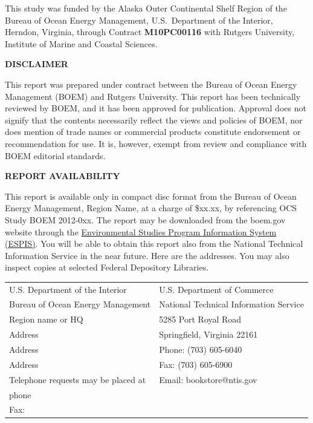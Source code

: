 This study was funded by the Alaska Outer Continental Shelf Region
of the Bureau of Ocean Energy Management, U.S.\ Department of the
Interior, Herndon, Virginia, through Contract
{\bf M10PC00116} with Rutgers University, Institute of Marine
and Coastal Sciences.


\newpage
\vfil
\centerline{\bf DISCLAIMER}

\vfil
\noindent
This report was prepared under contract between the Bureau of Ocean
Energy Management (BOEM) and Rutgers University. This report has
been technically reviewed by BOEM, and it has been approved for
publication. Approval does not signify that the contents necessarily
reflect the views and policies of BOEM, nor does mention of trade
names or commercial products constitute endorsement or
recommendation for use. It is, however, exempt from review and
compliance with BOEM editorial standards.

\vfil
\centerline{\bf REPORT AVAILABILITY}
\vfil

\noindent
This report is available only in compact disc format from the Bureau
of Ocean Energy Management, Region Name, at a charge of \$xx.xx, by
referencing OCS Study BOEM 2012-0xx. The report may be downloaded
from the boem.gov website through the
\href{http://www.data.boem.gov/homepg/data_center/other/espis/espismaster.asp?appid=1}
{Environmental Studies Program Information System (ESPIS)}. You will
be able to obtain this report also from the National Technical
Information Service in the near future. Here are the addresses. You
may also inspect copies at selected Federal Depository Libraries.

\begin{center}
\begin{tabular}{ll}
  U.S. Department of the Interior & U.S. Department of Commerce \\
  Bureau of Ocean Energy Management & National Technical Information
  Service \\
  Region name or HQ & 5285 Port Royal Road \\
  Address & Springfield, Virginia 22161 \\
  Address & Phone: (703) 605-6040 \\
  Address & Fax: (703) 605-6900 \\
  Telephone requests may be placed at & Email: bookstore@ntis.gov \\
  phone \\
  Fax: 
\end{tabular}
\end{center}
\vfil

